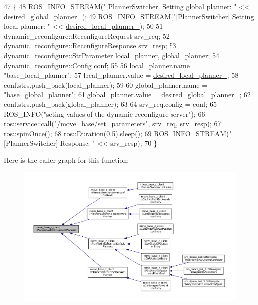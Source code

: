 \begin{DoxyCode}
47 \{
48   ROS\_INFO\_STREAM(\textcolor{stringliteral}{"[PlannerSwitcher] Setting global planner: "} << 
      \hyperlink{classmove__base__z__client_1_1PlannerSwitcher_a004c15858f0a6b9abcd8211d58a7e34c}{desired\_global\_planner\_});
49   ROS\_INFO\_STREAM(\textcolor{stringliteral}{"[PlannerSwitcher] Setting local planner: "} << 
      \hyperlink{classmove__base__z__client_1_1PlannerSwitcher_ae47bd6c9c70b27cddcb394f26bb9372d}{desired\_local\_planner\_});
50 
51   dynamic\_reconfigure::ReconfigureRequest srv\_req;
52   dynamic\_reconfigure::ReconfigureResponse srv\_resp;
53   dynamic\_reconfigure::StrParameter local\_planner, global\_planner;
54   dynamic\_reconfigure::Config conf;
55 
56   local\_planner.name = \textcolor{stringliteral}{"base\_local\_planner"};
57   local\_planner.value = \hyperlink{classmove__base__z__client_1_1PlannerSwitcher_ae47bd6c9c70b27cddcb394f26bb9372d}{desired\_local\_planner\_};
58   conf.strs.push\_back(local\_planner);
59 
60   global\_planner.name = \textcolor{stringliteral}{"base\_global\_planner"};
61   global\_planner.value = \hyperlink{classmove__base__z__client_1_1PlannerSwitcher_a004c15858f0a6b9abcd8211d58a7e34c}{desired\_global\_planner\_};
62   conf.strs.push\_back(global\_planner);
63 
64   srv\_req.config = conf;
65   ROS\_INFO(\textcolor{stringliteral}{"seting values of the dynamic reconfigure server"});
66   ros::service::call(\textcolor{stringliteral}{"/move\_base/set\_parameters"}, srv\_req, srv\_resp);
67   ros::spinOnce();
68   ros::Duration(0.5).sleep();
69   ROS\_INFO\_STREAM(\textcolor{stringliteral}{"[PlannerSwitcher] Response: "} << srv\_resp);
70 \}
\end{DoxyCode}


Here is the caller graph for this function\+:
\nopagebreak
\begin{figure}[H]
\begin{center}
\leavevmode
\includegraphics[width=350pt]{classmove__base__z__client_1_1PlannerSwitcher_a189ac8c027169a111c7d8e14d864752f_icgraph}
\end{center}
\end{figure}




